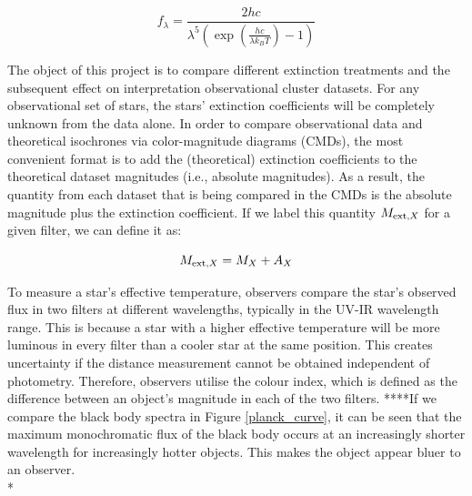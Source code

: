 \documentclass[12pt, a4paper]{report}
\begin{document}
\begin{equation}
f_{\lambda} = \frac{2hc}{\lambda^{5}\left(\exp\left({\frac{hc}{\lambda k_{B}T}}\right) - 1\right)}
\label{planck_bb}
\end{equation} 

The object of this project is to compare different extinction treatments and the subsequent effect on interpretation observational cluster datasets. For any observational set of stars, the stars' extinction coefficients will be completely unknown from the data alone. In order to compare observational data and theoretical isochrones via color-magnitude diagrams (CMDs), the most convenient format is to add the (theoretical) extinction coefficients to the theoretical dataset magnitudes (i.e., absolute magnitudes). As a result, the quantity from each dataset that is being compared in the CMDs is the absolute magnitude plus the extinction coefficient. If we label this quantity $M_{\textnormal{ext},X}$ for a given filter, we can define it as:

\begin{equation}
M_{\textnormal{ext},X} = M_{X} + A_{X}
\end{equation}

To measure a star's effective temperature, observers compare the star's observed flux in two filters at different wavelengths, typically in the UV-IR wavelength range. This is because a star with a higher effective temperature will be more luminous in every filter than a cooler star at the same position. This creates uncertainty if the distance measurement cannot be obtained independent of photometry. Therefore, observers utilise the colour index, which is defined as the difference between an object's magnitude in each of the two filters. ****If we compare the black body spectra in Figure \ref{planck_curve}, it can be seen that the maximum monochromatic flux of the black body occurs at an increasingly shorter wavelength for increasingly hotter objects. This makes the object appear bluer to an observer.\\*
\end{document}
